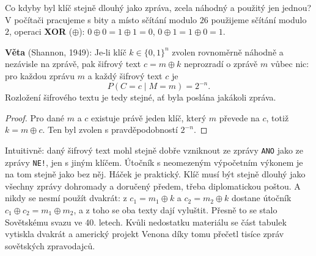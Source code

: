 Co kdyby byl klíč stejně dlouhý jako zpráva, zcela náhodný a použitý jen jednou? V počítači pracujeme s bity a místo sčítání modulo $26$ použijeme sčítání modulo $2$, operaci \textbf{XOR} ($\oplus$): $0\oplus 0 = 1\oplus 1 = 0$, $0\oplus 1 = 1\oplus 0 = 1$.

\begin{center}
\end{center}

\begin{definitionbox}
  \textbf{Věta} (Shannon, 1949): Je-li klíč $k\in\{0, 1\}^n$ zvolen rovnoměrně náhodně a nezávisle na zprávě, pak šifrový text $c = m\oplus k$ neprozradí o zprávě $m$ vůbec nic: pro každou zprávu $m$ a každý šifrový text $c$ je
  \begin{equation*}
    P(C = c\mid M = m) = 2^{-n}.
  \end{equation*}
  Rozložení šifrového textu je tedy stejné, ať byla poslána jakákoli zpráva.
\end{definitionbox}

\begin{proof}
  Pro dané $m$ a $c$ existuje právě jeden klíč, který $m$ převede na $c$, totiž $k = m\oplus c$. Ten byl zvolen s pravděpodobností $2^{-n}$.
\end{proof}

Intuitivně: daný šifrový text mohl stejně dobře vzniknout ze zprávy \texttt{ANO} jako ze zprávy \texttt{NE!}, jen s jiným klíčem. Útočník s neomezeným výpočetním výkonem je na tom stejně jako bez něj. Háček je praktický. Klíč musí být stejně dlouhý jako všechny zprávy dohromady a doručený předem, třeba diplomatickou poštou. A nikdy se nesmí použít dvakrát: z $c_1 = m_1\oplus k$ a $c_2 = m_2\oplus k$ dostane útočník $c_1\oplus c_2 = m_1\oplus m_2$, a z toho se oba texty dají vyluštit. Přesně to se stalo Sovětskému svazu ve 40. letech. Kvůli nedostatku materiálu se část tabulek vytiskla dvakrát a americký projekt Venona díky tomu přečetl tisíce zpráv sovětských zpravodajců.

